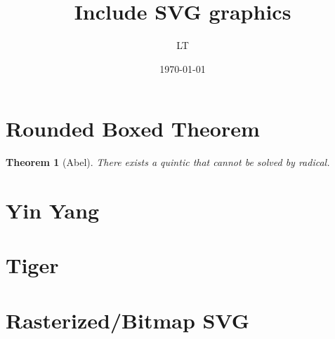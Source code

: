 \documentclass{article}
\newtheorem{thm}{Theorem}
\begin{document}
\title{Include SVG graphics}
\author{LT}
\date{\today}
\maketitle

\section{Rounded Boxed Theorem}

\vspace{0.5cm}
\vspace{0.2cm}
\begin{thm}[Abel]
There exists a quintic that cannot be solved by radical.
\end{thm}
\vspace{0.5cm}

\section{Yin Yang}

\section{Tiger}

\vspace{10cm}

\section{Rasterized/Bitmap SVG}
\end{document}
